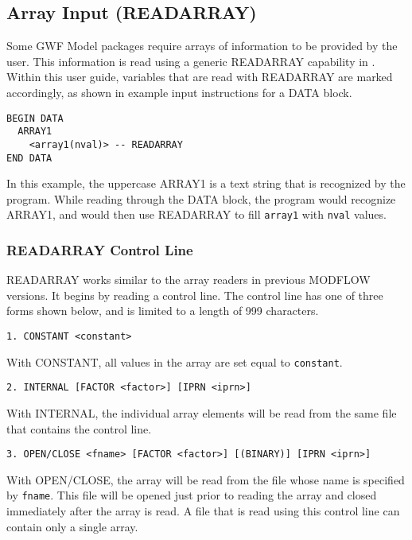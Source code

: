 \subsection{Array Input (READARRAY)}
Some GWF Model packages require arrays of information to be provided by the user.  This information is read using a generic READARRAY capability in \mf.  Within this user guide, variables that are read with READARRAY are marked accordingly, as shown in example input instructions for a DATA block.  

\begin{lstlisting}[style=blockdefinition]
BEGIN DATA
  ARRAY1
    <array1(nval)> -- READARRAY
END DATA
\end{lstlisting}

\noindent In this example, the uppercase ARRAY1 is a text string that is recognized by the program.  While reading through the DATA block, the program would recognize ARRAY1, and would then use READARRAY to fill \texttt{array1} with \texttt{nval} values.

\subsubsection{READARRAY Control Line}

READARRAY works similar to the array readers in previous MODFLOW versions.  It begins by reading a control line.  The control line has one of three forms shown below, and is limited to a length of 999 characters.

\begin{lstlisting}[style=blockdefinition]
1. CONSTANT <constant> 
\end{lstlisting}
With CONSTANT, all values in the array are set equal to \texttt{constant}. 

\begin{lstlisting}[style=blockdefinition]
2. INTERNAL [FACTOR <factor>] [IPRN <iprn>] 
\end{lstlisting}
With INTERNAL, the individual array elements will be read from the same file that contains the control line. 

\begin{lstlisting}[style=blockdefinition]
3. OPEN/CLOSE <fname> [FACTOR <factor>] [(BINARY)] [IPRN <iprn>]
\end{lstlisting}
With OPEN/CLOSE, the array will be read from the file whose name is specified by \texttt{fname}. This file will be opened just prior to reading the array and closed immediately after the array is read. A file that is read using this control line can contain only a single array. 

